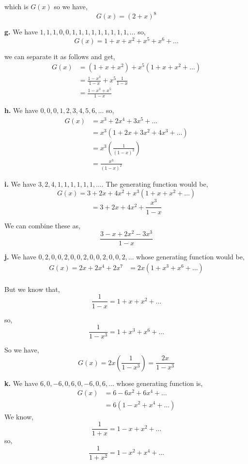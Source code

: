 \documentclass[a4paper]{report}
\begin{document}
which is $G(x)$ so we have,  
$$ G(x)  =  (2 + x)^{8}$$

\textbf{g.}  We have $\displaystyle 1,1,1,0,0,1,1,1,1,1,1,1,1,1,\dots$ so, 
$$ G(x) = 1 + x + x^2 + x^{5} + x^{6}+ \dots $$ 

we can separate it as follows and get,
\begin{align*}
    G(x) &= (1 + x + x^2) + x^{5}(1 + x + x^{2} + \dots)\\
         &= \frac{1 - x^{3}}{1 - x} + x^{5}\frac{1}{1 - x}\\
         &= \frac{1 - x^{3} + x^{5}}{1 - x}
\end{align*}

\textbf{h.}  We have $\displaystyle 0,0,0,1,2,3,4,5,6,\dots$ so, 
\begin{align*}
    G(x) &= x^{3} + 2x^{4} + 3x^{5} + \dots \\
         &= x^{3}( 1 + 2x + 3x^2 + 4x^{3} + \dots)\\
         &= x^{3} (\frac{1}{(1-x)^2}) \\
         &= \frac{x^{3}}{(1 - x)^2}
\end{align*}

\textbf{i.} 
We have $\displaystyle 3,2,4,1,1,1,1,1,1,\dots$. The generating function would be, 
$$ G(x) = 3 + 2x + 4x^2  + x^{3}(1 + x + x^2 + \dots)$$  
$$ = 3 + 2x + 4x^2  + \frac{x^{3}}{1 - x}$$

We can combine these as, 
$$ \frac{3 - x + 2x^2 - 3x^{3}}{1 - x} $$ 

\textbf{j. } We have $\displaystyle 0,2,0,0,2,0,0,2,0,0,2,0,0,2,\dots$ whose generating function would be,  
\begin{align*}
    G(x)  = 2x + 2x^{4} + 2x^{7} &= 2x(1 + x^{3}  + x^{6} + \dots)\\
\end{align*}

But we know that, 
$$ \frac{1}{1 - x} = 1 + x + x^2 + \dots $$ 

so, 
$$ \frac{1}{1 - x^{3}} = 1 + x^{3} + x^{6} + \dots $$ 

So we have, 
$$ G(x) = 2x( \frac{1}{1-x^{3}}) = \frac{2x}{1- x^{3}} $$ 

\textbf{k.}  We have $\displaystyle 6,0,-6,0,6,0,-6,0,6,\dots$ whose generating function is, 
\begin{align*}
    G(x) &= 6 -6x^2 + 6x^{4} + \dots \\
         &= 6( 1 - x^{2} + x^{4} + \dots)
\end{align*}
We know, 
$$ \frac{1}{1 + x} = 1 - x + x^2 + \dots $$ 
so, 
$$ \frac{1}{1 + x^2} = 1 - x^2  + x^{4} + \dots $$ 
\end{document}
